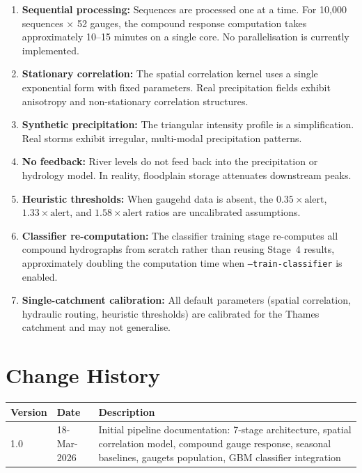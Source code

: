 \documentclass[11pt,a4paper]{article}
\begin{document}
\begin{enumerate}[nosep]
    \item \textbf{Sequential processing:} Sequences are processed one at a time.
          For 10{,}000 sequences $\times$ 52 gauges, the compound response
          computation takes approximately 10--15 minutes on a single core.
          No parallelisation is currently implemented.
    \item \textbf{Stationary correlation:} The spatial correlation kernel uses a
          single exponential form with fixed parameters. Real precipitation
          fields exhibit anisotropy and non-stationary correlation structures.
    \item \textbf{Synthetic precipitation:} The triangular intensity profile is
          a simplification. Real storms exhibit irregular, multi-modal
          precipitation patterns.
    \item \textbf{No feedback:} River levels do not feed back into the
          precipitation or hydrology model. In reality, floodplain storage
          attenuates downstream peaks.
    \item \textbf{Heuristic thresholds:} When gaugehd data is absent, the
          $0.35 \times \text{alert}$, $1.33 \times \text{alert}$, and
          $1.58 \times \text{alert}$ ratios are uncalibrated assumptions.
    \item \textbf{Classifier re-computation:} The classifier training stage
          re-computes all compound hydrographs from scratch rather than
          reusing Stage~4 results, approximately doubling the computation
          time when \texttt{--train-classifier} is enabled.
    \item \textbf{Single-catchment calibration:} All default parameters
          (spatial correlation, hydraulic routing, heuristic thresholds)
          are calibrated for the Thames catchment and may not generalise.
\end{enumerate}

\section{Change History}

\begin{center}
\begin{tabular}{llp{7.5cm}}
\toprule
\textbf{Version} & \textbf{Date} & \textbf{Description} \\
\midrule
1.0 & 18-Mar-2026 & Initial pipeline documentation: 7-stage architecture,
    spatial correlation model, compound gauge response, seasonal baselines,
    gaugets population, GBM classifier integration \\
\bottomrule
\end{tabular}
\end{center}
\end{document}
